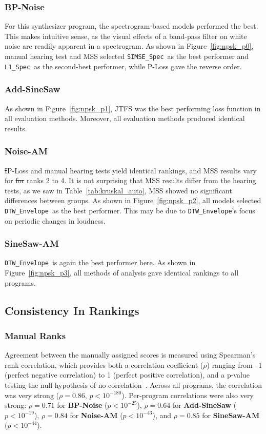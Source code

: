 \documentclass[lettersize,journal]{IEEEtran}
\makeatletter
\newcommand{\SIMSESpec}{\texttt{SIMSE\_Spec}}
\newcommand{\LoneSpec}{\texttt{L1\_Spec}}
\newcommand{\DTWEnv}{\texttt{DTW\_Envelope}}
\newcommand{\BPNoise}{\textbf{BP-Noise}}
\newcommand{\AddSineSaw}{\textbf{Add-SineSaw}}
\newcommand{\AmpMod}{\textbf{Noise-AM}}
\newcommand{\FMMod}{\textbf{SineSaw-AM}}
\providecommand{\DIFdel}[1]{{\protect\color{red}\sout{#1}}} %
\providecommand{\DIFdelbegin}{} %
\providecommand{\DIFdelend}{} %
\providecommand{\DIFscaledelfig}{0.5}
\newlength{\DIFdelgraphicswidth} %
\newlength{\DIFdelgraphicsheight} %
\providecommand{\DIFdelincludegraphics}[2][]{%
\sbox{\DIFdelgraphicsbox}{\DIFOincludegraphics[#1]{#2}}%
\settoboxwidth{\DIFdelgraphicswidth}{\DIFdelgraphicsbox} %
\settoboxtotalheight{\DIFdelgraphicsheight}{\DIFdelgraphicsbox} %
\scalebox{\DIFscaledelfig}{%
\parbox[b]{\DIFdelgraphicswidth}{\usebox{\DIFdelgraphicsbox}\\[-\baselineskip] \rule{\DIFdelgraphicswidth}{0em}}\llap{\resizebox{\DIFdelgraphicswidth}{\DIFdelgraphicsheight}{%
\setlength{\unitlength}{\DIFdelgraphicswidth}%
\begin{picture}(1,1)%
\thicklines\linethickness{2pt} %
{\color[rgb]{1,0,0}\put(0,0){\framebox(1,1){}}}%
{\color[rgb]{1,0,0}\put(0,0){\line( 1,1){1}}}%
{\color[rgb]{1,0,0}\put(0,1){\line(1,-1){1}}}%
\end{picture}%
}\hspace*{3pt}}} %
} %
\DeclareRobustCommand{\DIFdelbegin}{\DIFOdelbegin \let\includegraphics\DIFdelincludegraphics} %
\DeclareRobustCommand{\DIFdelend}{\DIFOaddend \let\includegraphics\DIFOincludegraphics} %
\let\sout@orig\sout %
\renewcommand{\sout}[1]{\ifmmode\text{\sout@orig{\ensuremath{#1}}}\else\sout@orig{#1}\fi} %
\makeatother
\begin{document}
\subsubsection{\BPNoise}
For this synthesizer program, the spectrogram-based models performed the best. This makes intuitive sense, as the visual effects of a band-pass filter on white noise are readily apparent in a spectrogram. As shown in Figure~\ref{fig:npsk_p0}, manual hearing test and MSS selected \SIMSESpec~as the best performer and \LoneSpec~as the second-best performer, while P-Loss gave the reverse order. 


\subsubsection{\AddSineSaw}
As shown in Figure~\ref{fig:npsk_p1}, JTFS was the best performing loss function in all evaluation methods. Moreover, all evaluation methods produced identical results. 

\subsubsection{\AmpMod}
\DIFdelbegin \DIFdel{I}\DIFdelend P-Loss  and manual hearing tests yield identical rankings, and MSS results vary for \DIFdelbegin \DIFdel{for }\DIFdelend ranks 2 to 4. It is not surprising that MSS results differ from the hearing tests, as we saw in Table~\ref{tab:kruskal_auto}, MSS showed no significant differences between groups. As shown in Figure~\ref{fig:npsk_p2}, all models selected \DTWEnv~as the best performer. This may be due to \DTWEnv's focus on periodic changes in loudness.

\subsubsection{\FMMod}
\DTWEnv~is again the best performer here. As shown in Figure~\ref{fig:npsk_p3}, all methods of analysis gave identical rankings to all programs.


\subsection{Consistency In Rankings}
\label{sec:consistency_in_rankings}
\subsubsection{Manual Ranks} Agreement between the manually assigned scores is measured using Spearman’s rank correlation, which provides both a correlation coefficient ($\rho$) ranging from –1 (perfect negative correlation) to 1 (perfect positive correlation), and a p-value testing the null hypothesis of no correlation~\cite{spearman1987proof,rebekic2015pearson}. Across all programs, the correlation was very strong ($\rho = 0.86$, $p < 10^{-180}$). Per-program correlations were also very strong: $\rho = 0.71$ for \BPNoise{} ($p < 10^{-25}$), $\rho = 0.64$ for \AddSineSaw{} ($p < 10^{-19}$), $\rho = 0.84$ for \AmpMod{} ($p < 10^{-43}$), and $\rho = 0.85$ for \FMMod{} ($p < 10^{-44}$). 
\end{document}

